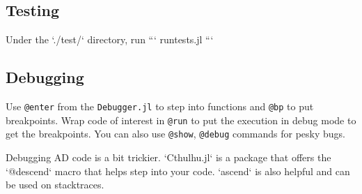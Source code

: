 \documentclass[10pt]{article}
\begin{document}
\subsection{Testing}

Under the `./test/` directory, run
```
runtests.jl
```

\subsection{Debugging}

Use \texttt{@enter} from the \texttt{Debugger.jl} to step into functions and \texttt{@bp} to put breakpoints.
Wrap code of interest in \texttt{@run} to put the execution in debug mode to get the breakpoints.
You can also use \texttt{@show}, \texttt{@debug} commands for pesky bugs.

Debugging AD code is a bit trickier.
`Cthulhu.jl` is a package that offers the `@descend` macro that helps step into your code.
`ascend` is also helpful and can be used on stacktraces.


\end{document}
